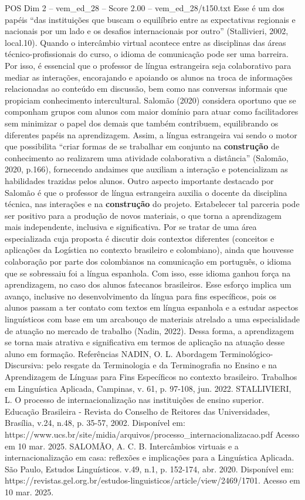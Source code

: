 \begin{textsample}{POS Dim 2 – vem\_ed\_28 – Score 2.00 – vem\_ed\_28/t150.txt}
Esse é um dos papéis “das instituições que buscam o equilíbrio entre as expectativas regionais e nacionais por um lado e os desafios internacionais por outro” (Stallivieri, 2002, local.10).
Quando o intercâmbio virtual acontece entre as disciplinas das áreas técnico-profissionais do curso, o idioma de comunicação pode ser uma barreira.
Por isso, é essencial que o professor de língua estrangeira seja colaborativo para mediar as interações, encorajando e apoiando os alunos na troca de informações relacionadas ao conteúdo em discussão, bem como nas conversas informais que propiciam conhecimento intercultural.
Salomão (2020) considera oportuno que se componham grupos com alunos com maior domínio para atuar como facilitadores sem minimizar o papel dos demais que também contribuem, equilibrando os diferentes papéis na aprendizagem.
Assim, a língua estrangeira vai sendo o motor que possibilita “criar formas de se trabalhar em conjunto na \textbf{construção} de conhecimento ao realizarem uma atividade colaborativa a distância” (Salomão, 2020, p.166), fornecendo andaimes que auxiliam a interação e potencializam as habilidades trazidas pelos alunos.
Outro aspecto importante destacado por Salomão é que o professor de língua estrangeira auxilia o docente da disciplina técnica, nas interações e na \textbf{construção} do projeto.
Estabelecer tal parceria pode ser positivo para a produção de novos materiais, o que torna a aprendizagem mais independente, inclusiva e significativa.
Por se tratar de uma área especializada cuja proposta é discutir dois contextos diferentes (conceitos e aplicações da Logística no contexto brasileiro e colombiano), ainda que houvesse colaboração por parte dos colombianos na comunicação em português, o idioma que se sobressaiu foi a língua espanhola.
Com isso, esse idioma ganhou força na aprendizagem, no caso dos alunos fatecanos brasileiros.
Esse esforço implica um avanço, inclusive no desenvolvimento da língua para fins específicos, pois os alunos passam a ter contato com textos em língua espanhola e a estudar aspectos linguísticos com base em um arcabouço de materiais atrelado a uma especialidade de atuação no mercado de trabalho (Nadin, 2022).
Dessa forma, a aprendizagem se torna mais atrativa e significativa em termos de aplicação na atuação desse aluno em formação.
Referências NADIN, O.
L.
Abordagem Terminológico-Discursiva: pelo resgate da Terminologia e da Terminografia no Ensino e na Aprendizagem de Línguas para Fins Específicos no contexto brasileiro.
Trabalhos em Linguística Aplicada, Campinas, v. 61, p. 97-108, jun. 2022.
STALLIVIERI, L.
O processo de internacionalização nas instituições de ensino superior.
Educação Brasileira - Revista do Conselho de Reitores das Universidades, Brasília, v.24, n.48, p. 35-57, 2002.
Disponível em: https://www.ucs.br/site/midia/arquivos/processo\_internacionalizacao.pdf Acesso em 10 mar. 2025.
SALOMÃO, A.
C.
B.
Intercâmbios virtuais e a internacionalização em casa: reflexões e implicações para a Linguística Aplicada.
São Paulo, Estudos Linguísticos. v.49, n.1, p. 152-174, abr. 2020.
Disponível em: https://revistas.gel.org.br/estudos-linguisticos/article/view/2469/1701.
Acesso em 10 mar. 2025.

\end{textsample}
